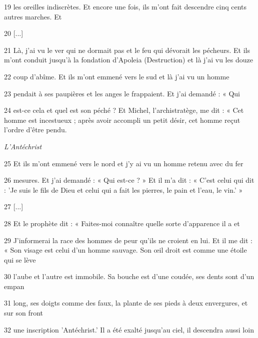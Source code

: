 \par 19 les oreilles indiscrètes. Et encore une fois, ils m'ont fait descendre cinq cents autres marches. Et

\par 20 [...]

\par 21 Là, j'ai vu le ver qui ne dormait pas et le feu qui dévorait les pécheurs. Et ils m'ont conduit jusqu'à la fondation d'Apoleia (Destruction) et là j'ai vu les douze

\par 22 coup d'abîme. Et ils m'ont emmené vers le sud et là j'ai vu un homme

\par 23 pendait à ses paupières et les anges le frappaient. Et j'ai demandé : « Qui

\par 24 est-ce cela et quel est son péché ? Et Michel, l'archistratège, me dit : « Cet homme est incestueux ; après avoir accompli un petit désir, cet homme reçut l'ordre d'être pendu.

\par \textit{L'Antéchrist}

\par 25 Et ils m'ont emmené vers le nord et j'y ai vu un homme retenu avec du fer

\par 26 mesures. Et j'ai demandé : « Qui est-ce ? » Et il m'a dit : « C'est celui qui dit : 'Je suis le fils de Dieu et celui qui a fait les pierres, le pain et l'eau, le vin.' »

\par 27 [...]

\par 28 Et le prophète dit : « Faites-moi connaître quelle sorte d'apparence il a et

\par 29 J'informerai la race des hommes de peur qu'ils ne croient en lui. Et il me dit : « Son visage est celui d’un homme sauvage. Son œil droit est comme une étoile qui se lève

\par 30 l'aube et l'autre est immobile. Sa bouche est d'une coudée, ses dents sont d'un empan

\par 31 long, ses doigts comme des faux, la plante de ses pieds à deux envergures, et sur son front

\par 32 une inscription 'Antéchrist.' Il a été exalté jusqu'au ciel, il descendra aussi loin

